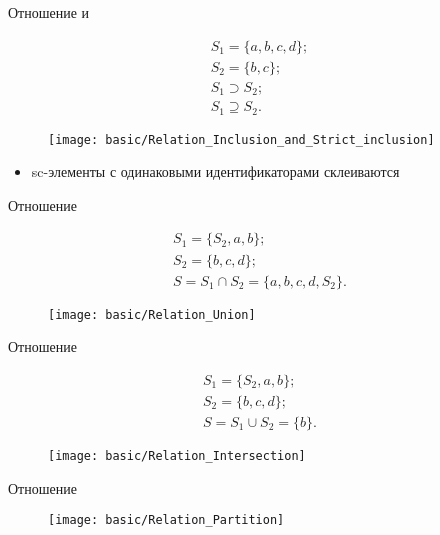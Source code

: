 \begin{frame}[shrink=10]{Отношение  и }
  \begin{center}
    \begin{eqnarray*}
      S_1 = \{ a, b, c, d \}; \\
      S_2 = \{ b, c \}; \\
      S_1 \supset S_2; \\
      S_1 \supseteq S_2.
    \end{eqnarray*}

    \objeqv

    \begin{figure}
      \texttt{[image: basic/Relation\_Inclusion\_and\_Strict\_inclusion]}
    \end{figure}
  \end{center}

  \begin{itemize}
  \item sc-элементы с одинаковыми идентификаторами склеиваются
  \end{itemize}
\end{frame}

\begin{frame}[shrink=10]{Отношение }
  \begin{center}
    \begin{eqnarray*}
      S_1 = \{ S_2, a, b \}; \\
      S_2 = \{ b, c, d \}; \\
      S = S_1 \cap S_2 = \{ a, b, c, d, S_2 \}.
    \end{eqnarray*}

    \objeqv

    \begin{figure}
      \texttt{[image: basic/Relation\_Union]}
    \end{figure}
  \end{center}
\end{frame}

\begin{frame}[shrink=10]{Отношение }
  \begin{center}
    \begin{eqnarray*}
      S_1 = \{ S_2, a, b \}; \\
      S_2 = \{ b, c, d \}; \\
      S = S_1 \cup S_2 = \{ b \}.
    \end{eqnarray*}

    \objeqv

    \begin{figure}
      \texttt{[image: basic/Relation\_Intersection]}
    \end{figure}
  \end{center}
\end{frame}

\begin{frame}[shrink=10]{Отношение }
  \begin{center}
    \begin{figure}
      \texttt{[image: basic/Relation\_Partition]}
    \end{figure}
  \end{center}
\end{frame}

